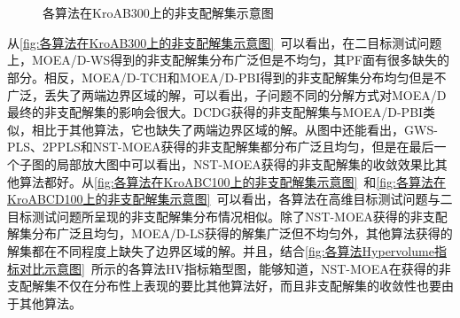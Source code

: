 \begin{figure}[!h]
     \qquad
      \\
     \quad
     \quad
     \\
     \quad
     \quad
    \caption[各算法在KroAB300上的非支配解集示意图]{各算法在KroAB300上的非支配解集示意图}
    \label{fig:各算法在KroAB300上的非支配解集示意图}
\end{figure}
\par
从\autoref{fig:各算法在KroAB300上的非支配解集示意图}~可以看出，在二目标测试问题上，MOEA/D-WS得到的非支配解集分布广泛但是不均匀，其PF面有很多缺失的部分。相反，MOEA/D-TCH和MOEA/D-PBI得到的非支配解集分布均匀但是不广泛，丢失了两端边界区域的解，可以看出，子问题不同的分解方式对MOEA/D最终的非支配解集的影响会很大。DCDG获得的非支配解集与MOEA/D-PBI类似，相比于其他算法，它也缺失了两端边界区域的解。从图中还能看出，GWS-PLS、2PPLS和NST-MOEA获得的非支配解集都分布广泛且均匀，但是在最后一个子图的局部放大图中可以看出，NST-MOEA获得的非支配解集的收敛效果比其他算法都好。从\autoref{fig:各算法在KroABC100上的非支配解集示意图}~和\autoref{fig:各算法在KroABCD100上的非支配解集示意图}~可以看出，各算法在高维目标测试问题与二目标测试问题所呈现的非支配解集分布情况相似。除了NST-MOEA获得的非支配解集分布广泛且均匀，MOEA/D-LS获得的解集广泛但不均匀外，其他算法获得的解集都在不同程度上缺失了边界区域的解。并且，结合\autoref{fig:各算法Hypervolume指标对比示意图}~所示的各算法HV指标箱型图，能够知道，NST-MOEA在获得的非支配解集不仅在分布性上表现的要比其他算法好，而且非支配解集的收敛性也要由于其他算法。
